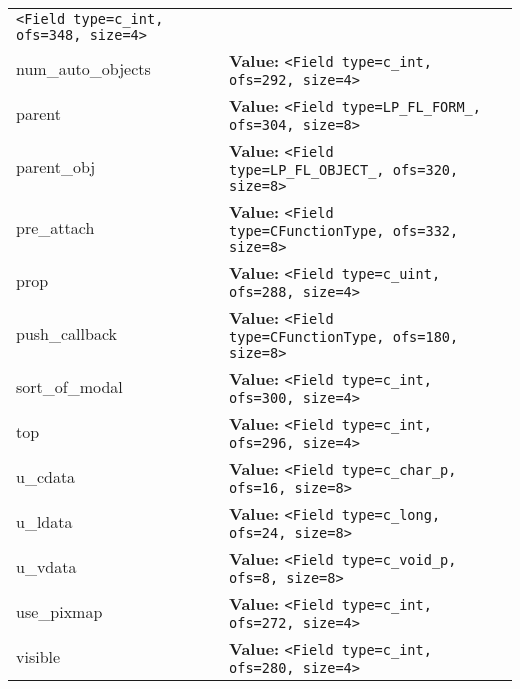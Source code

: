 \begin{longtable}{|p{\varnamewidth}|p{\vardescrwidth}|l}
{\tt {\textless}Field type=c\_int, ofs=348, size=4{\textgreater}}&\\
\cline{1-2}
\raggedright n\-u\-m\-\_\-a\-u\-t\-o\-\_\-o\-b\-j\-e\-c\-t\-s\- & \raggedright \textbf{Value:} 
{\tt {\textless}Field type=c\_int, ofs=292, size=4{\textgreater}}&\\
\cline{1-2}
\raggedright p\-a\-r\-e\-n\-t\- & \raggedright \textbf{Value:} 
{\tt {\textless}Field type=LP\_FL\_FORM\_, ofs=304, size=8{\textgreater}}&\\
\cline{1-2}
\raggedright p\-a\-r\-e\-n\-t\-\_\-o\-b\-j\- & \raggedright \textbf{Value:} 
{\tt {\textless}Field type=LP\_FL\_OBJECT\_, ofs=320, size=8{\textgreater}}&\\
\cline{1-2}
\raggedright p\-r\-e\-\_\-a\-t\-t\-a\-c\-h\- & \raggedright \textbf{Value:} 
{\tt {\textless}Field type=CFunctionType, ofs=332, size=8{\textgreater}}&\\
\cline{1-2}
\raggedright p\-r\-o\-p\- & \raggedright \textbf{Value:} 
{\tt {\textless}Field type=c\_uint, ofs=288, size=4{\textgreater}}&\\
\cline{1-2}
\raggedright p\-u\-s\-h\-\_\-c\-a\-l\-l\-b\-a\-c\-k\- & \raggedright \textbf{Value:} 
{\tt {\textless}Field type=CFunctionType, ofs=180, size=8{\textgreater}}&\\
\cline{1-2}
\raggedright s\-o\-r\-t\-\_\-o\-f\-\_\-m\-o\-d\-a\-l\- & \raggedright \textbf{Value:} 
{\tt {\textless}Field type=c\_int, ofs=300, size=4{\textgreater}}&\\
\cline{1-2}
\raggedright t\-o\-p\- & \raggedright \textbf{Value:} 
{\tt {\textless}Field type=c\_int, ofs=296, size=4{\textgreater}}&\\
\cline{1-2}
\raggedright u\-\_\-c\-d\-a\-t\-a\- & \raggedright \textbf{Value:} 
{\tt {\textless}Field type=c\_char\_p, ofs=16, size=8{\textgreater}}&\\
\cline{1-2}
\raggedright u\-\_\-l\-d\-a\-t\-a\- & \raggedright \textbf{Value:} 
{\tt {\textless}Field type=c\_long, ofs=24, size=8{\textgreater}}&\\
\cline{1-2}
\raggedright u\-\_\-v\-d\-a\-t\-a\- & \raggedright \textbf{Value:} 
{\tt {\textless}Field type=c\_void\_p, ofs=8, size=8{\textgreater}}&\\
\cline{1-2}
\raggedright u\-s\-e\-\_\-p\-i\-x\-m\-a\-p\- & \raggedright \textbf{Value:} 
{\tt {\textless}Field type=c\_int, ofs=272, size=4{\textgreater}}&\\
\cline{1-2}
\raggedright v\-i\-s\-i\-b\-l\-e\- & \raggedright \textbf{Value:} 
{\tt {\textless}Field type=c\_int, ofs=280, size=4{\textgreater}}&\\

\end{longtable}
